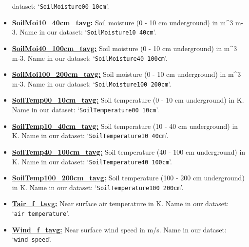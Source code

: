 \documentclass[10pt,parskip=half,
toc=sectionentrywithdots,
bibliography=totocnumbered,
captions=tableheading,numbers=noendperiod]{scrartcl}
\begin{document}
\begin{itemize}
  dataset: `\texttt{SoilMoisture00\ 10cm}'.
\item
  \href{https://developers.google.com/earth-engine/datasets/catalog/NASA_FLDAS_NOAH01_C_GL_M_V001}{\textbf{SoilMoi10\_40cm\_tavg:}}
  Soil moisture (0 - 10 cm underground) in m\^{}3 m-3. Name in our
  dataset: `\texttt{SoilMoisture10\ 40cm}'.
\item
  \href{https://developers.google.com/earth-engine/datasets/catalog/NASA_FLDAS_NOAH01_C_GL_M_V001}{\textbf{SoilMoi40\_100cm\_tavg:}}
  Soil moisture (0 - 10 cm underground) in m\^{}3 m-3. Name in our
  dataset: `\texttt{SoilMoisture40\ 100cm}'.
\item
  \href{https://developers.google.com/earth-engine/datasets/catalog/NASA_FLDAS_NOAH01_C_GL_M_V001}{\textbf{SoilMoi100\_200cm\_tavg:}}
  Soil moisture (0 - 10 cm underground) in m\^{}3 m-3. Name in our
  dataset: `\texttt{SoilMoisture100\ 200cm}'.
\item
  \href{https://developers.google.com/earth-engine/datasets/catalog/NASA_FLDAS_NOAH01_C_GL_M_V001}{\textbf{SoilTemp00\_10cm\_tavg:}}
  Soil temperature (0 - 10 cm underground) in K. Name in our dataset:
  `\texttt{SoilTemperature00\ 10cm}'.
\item
  \href{https://developers.google.com/earth-engine/datasets/catalog/NASA_FLDAS_NOAH01_C_GL_M_V001}{\textbf{SoilTemp10\_40cm\_tavg:}}
  Soil temperature (10 - 40 cm underground) in K. Name in our dataset:
  `\texttt{SoilTemperature10\ 40cm}'.
\item
  \href{https://developers.google.com/earth-engine/datasets/catalog/NASA_FLDAS_NOAH01_C_GL_M_V001}{\textbf{SoilTemp40\_100cm\_tavg:}}
  Soil temperature (40 - 100 cm underground) in K. Name in our dataset:
  `\texttt{SoilTemperature40\ 100cm}'.
\item
  \href{https://developers.google.com/earth-engine/datasets/catalog/NASA_FLDAS_NOAH01_C_GL_M_V001}{\textbf{SoilTemp100\_200cm\_tavg:}}
  Soil temperature (100 - 200 cm underground) in K. Name in our dataset:
  `\texttt{SoilTemperature100\ 200cm}'.
\item
  \href{https://developers.google.com/earth-engine/datasets/catalog/NASA_FLDAS_NOAH01_C_GL_M_V001}{\textbf{Tair\_f\_tavg:}}
  Near surface air temperature in K. Name in our dataset:
  `\texttt{air\ temperature}'.
\item
  \href{https://developers.google.com/earth-engine/datasets/catalog/NASA_FLDAS_NOAH01_C_GL_M_V001}{\textbf{Wind\_f\_tavg:}}
  Near surface wind speed in m/s. Name in our dataset:
  `\texttt{wind\ speed}'.\\

\end{itemize}
\end{document}
